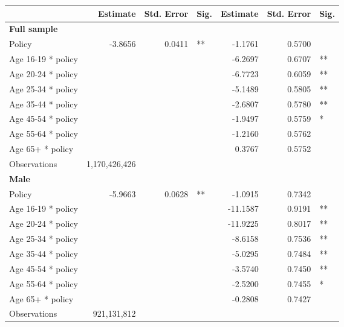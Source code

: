 
\begin{table}%
\centering 
\begin{tabular}{l r r l r r l} 

\hline 
 
 & Estimate & Std. Error & Sig. & Estimate & Std. Error & Sig. \\ 

\hline 
 
\textbf{Full sample} \\ 

Policy             &  -3.8656        &  0.0411       &   **       &  -1.1761        &  0.5700       &            \\ 
Age 16-19 * policy           & & &  &  -6.2697        &  0.6707       &   **       \\ 
Age 20-24 * policy           & & &  &  -6.7723        &  0.6059       &   **       \\ 
Age 25-34 * policy           & & &  &  -5.1489        &  0.5805       &   **       \\ 
Age 35-44 * policy           & & &  &  -2.6807        &  0.5780       &   **       \\ 
Age 45-54 * policy           & & &  &  -1.9497        &  0.5759       &    *       \\ 
Age 55-64 * policy           & & &  &  -1.2160        &  0.5762       &            \\ 
Age 65+ * policy           & & &  &  0.3767        &  0.5752       &            \\ 
Observations & 1,170,426,426 \\ 


\hline 

\textbf{Male} \\ 

Policy             &  -5.9663        &  0.0628       &   **       &  -1.0915        &  0.7342       &            \\ 
Age 16-19 * policy           & & &  &  -11.1587        &  0.9191       &   **       \\ 
Age 20-24 * policy           & & &  &  -11.9225        &  0.8017       &   **       \\ 
Age 25-34 * policy           & & &  &  -8.6158        &  0.7536       &   **       \\ 
Age 35-44 * policy           & & &  &  -5.0295        &  0.7484       &   **       \\ 
Age 45-54 * policy           & & &  &  -3.5740        &  0.7450       &   **       \\ 
Age 55-64 * policy           & & &  &  -2.5200        &  0.7455       &    *       \\ 
Age 65+ * policy           & & &  &  -0.2808        &  0.7427       &            \\ 
Observations & 921,131,812 \\ 



\end{tabular}
\end{table}
